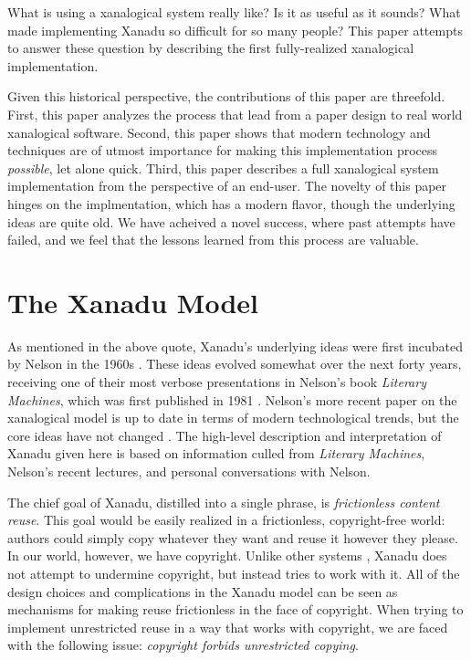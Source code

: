\documentclass{acm_proc_article-sp}
\begin{document}
What is using a xanalogical system really like?
Is it as useful as it sounds?
What made implementing Xanadu so difficult for so many people?  
This paper attempts to answer these question by describing the first fully-realized xanalogical implementation.

Given this historical perspective, the contributions of this paper are threefold.
First, this paper analyzes the process that lead from a paper design to real world xanalogical software.
Second, this paper shows that modern technology and techniques are of utmost importance for making this implementation process {\it possible}, let alone quick.
Third, this paper describes a full xanalogical system implementation from the perspective of an end-user.
The novelty of this paper hinges on the implmentation, which has a modern flavor, though the underlying ideas are quite old.
We have acheived a novel success, where past attempts have failed, and we feel that the lessons learned from this process are valuable.




\section{The Xanadu Model}

As mentioned in the above quote, Xanadu's underlying ideas were first incubated by Nelson in the 1960s \cite{Nelson1965}.  
These ideas evolved somewhat over the next forty years, receiving one of their most verbose presentations in Nelson's book {\it Literary Machines}, which was first published in 1981 \cite{NelsonLiteraryMachines}.  
Nelson's more recent paper on the xanalogical model is up to date in terms of modern technological trends, but the core ideas have not changed \cite{Nelson1999}.  
The high-level description and interpretation of Xanadu given here is based on information culled from {\it Literary Machines}, Nelson's recent lectures, and personal conversations with Nelson.

The chief goal of Xanadu, distilled into a single phrase, is {\it frictionless content reuse}.  
This goal would be easily realized in a frictionless, copyright-free world:  authors could simply copy whatever they want and reuse it however they please.  
In our world, however, we have copyright.
Unlike other systems \cite{Clark2000}, Xanadu does not attempt to undermine copyright, but instead tries to work with it. 
All of the design choices and complications in the Xanadu model can be seen as mechanisms for making reuse frictionless in the face of copyright.
When trying to implement unrestricted reuse in a way that works with copyright, we are faced with the following issue:  {\it copyright forbids unrestricted copying}.
\end{document}
